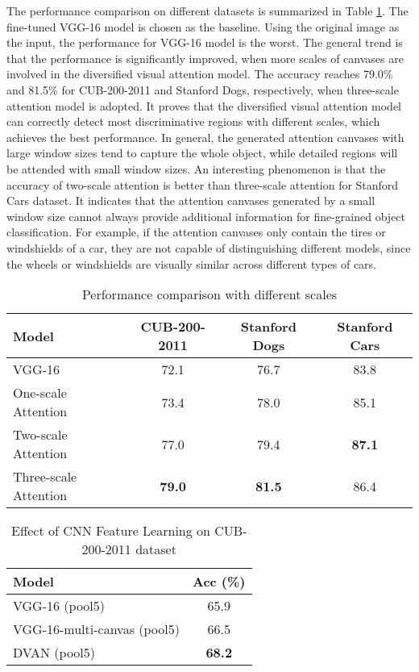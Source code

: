 \documentclass[journal]{IEEEtran}
\begin{document}
The performance comparison on different datasets is summarized in Table \ref{tab:comparison_cub_1}. The fine-tuned VGG-16 model is chosen as the baseline. Using the original image as the input, the performance for VGG-16 model is the worst. The general trend is that the performance is significantly improved, when more scales of canvases are involved in the diversified visual attention model. The accuracy reaches 79.0\% and 81.5\% for CUB-200-2011 and Stanford Dogs, respectively, when three-scale attention model is adopted. It proves that the diversified visual attention model can correctly detect most discriminative regions  with different scales, which achieves the best performance. In general, the generated attention canvases with large window sizes tend to capture the whole object, while detailed regions will be attended with small window sizes. An interesting phenomenon is that the accuracy of two-scale attention is better than three-scale attention for Stanford Cars dataset. It indicates that the attention canvases generated by a small window size cannot always provide additional information for fine-grained object classification. For example, if the attention canvases only contain the tires or windshields of a car, they are not capable of distinguishing different models, since the wheels or windshields are visually similar across different types of cars.

\begin{table}[!t]
  \centering
  \caption{Performance comparison with different scales}
  \label{tab:comparison_cub_1}
  \begin{tabular}{lccc}
    \hline\hline
    Model                            & CUB-200-2011 & Stanford Dogs & Stanford Cars\\
    \hline
    VGG-16                           & 72.1     & 76.7  & 83.8\\
    One-scale Attention              & 73.4     & 78.0  & 85.1\\
    Two-scale Attention              & 77.0     & 79.4  & \textbf{87.1}\\
    Three-scale Attention            & \textbf{79.0} & \textbf{81.5} & 86.4 \\
    \hline\hline
  \end{tabular}
  \vspace{-0.2in}
\end{table}

\begin{table}[!t]
  \centering
  \caption{Effect of CNN Feature Learning on CUB-200-2011 dataset}
  \vspace{-0.1in}
  \label{tab:pool5}
  \begin{tabular}{lc}
    \hline\hline
    Model                & Acc (\%)\\
    \hline
    VGG-16 (pool5)              & 65.9\\
    VGG-16-multi-canvas (pool5) & 66.5\\
    DVAN (pool5)                & \textbf{68.2}\\
    \hline\hline
  \end{tabular}
  \vspace{-0.2in}
\end{table}
\end{document}
